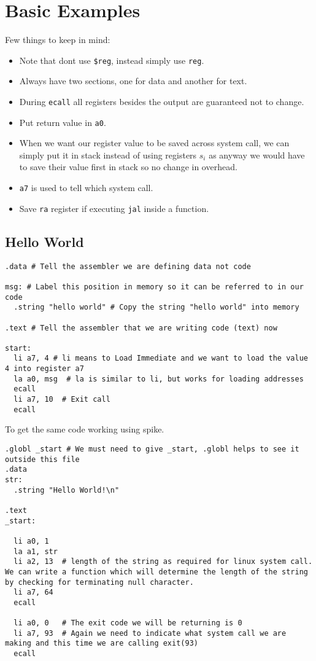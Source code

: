 \section{Basic Examples}

Few things to keep in mind:

\begin{itemize}
  \item Note that dont use \texttt{\$reg}, instead simply use \texttt{reg}.
  \item Always have two sections, one for data and another for text.
  \item During \texttt{ecall} all registers besides the output are guaranteed not to change.
  \item Put return value in \texttt{a0}.
  \item When we want our register value to be saved across system call, we can simply put it in stack instead of using registers $s_i$ as anyway we would have to save their value first in stack so no change in overhead.
  \item \texttt{a7} is used to tell which system call.
  \item Save \texttt{ra} register if executing \texttt{jal} inside a function.
\end{itemize}

\subsection{Hello World}

\begin{verbatim}
.data # Tell the assembler we are defining data not code

msg: # Label this position in memory so it can be referred to in our code
  .string "hello world" # Copy the string "hello world" into memory 

.text # Tell the assembler that we are writing code (text) now 

start:
  li a7, 4 # li means to Load Immediate and we want to load the value 4 into register a7
  la a0, msg  # la is similar to li, but works for loading addresses
  ecall
  li a7, 10  # Exit call
  ecall
\end{verbatim}

To get the same code working using spike. 

\begin{verbatim}
.globl _start # We must need to give _start, .globl helps to see it outside this file
.data 
str:   
  .string "Hello World!\n" 

.text 
_start: 

  li a0, 1   
  la a1, str 
  li a2, 13  # length of the string as required for linux system call. We can write a function which will determine the length of the string by checking for terminating null character.
  li a7, 64  
  ecall 

  li a0, 0   # The exit code we will be returning is 0
  li a7, 93  # Again we need to indicate what system call we are making and this time we are calling exit(93)
  ecall 
\end{verbatim}

